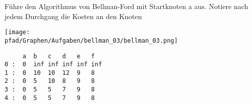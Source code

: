 ﻿\question[4]
Führe den Algorithmus von Bellman-Ford mit Startknoten a aus.
Notiere nach jedem Durchgang die Kosten an den Knoten

\texttt{[image: \\pfad/Graphen/Aufgaben/bellman\_03/bellman\_03.png]}
\begin{solutionbox}{5cm}
\begin{lstlisting}
     a  b   c   d   e   f
0 :  0  inf inf inf inf inf
1 :  0  10  10  12  9   8
2 :  0  5   10  8   9   8
3 :  0  5   5   7   9   8
4 :  0  5   5   7   9   8
\end{lstlisting}
\end{solutionbox}
